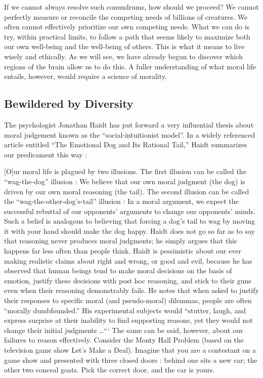 \documentclass[a4paper,14pt]{extarticle}
\begin{document}
If we cannot always resolve such conundrums, how should we proceed?
We cannot perfectly measure or reconcile the competing needs of billions of creatures.
We often cannot effectively prioritize our own competing needs.
What we can do is try, within practical limits, to follow a path that seems likely to maximize both our own well-being and the well-being of others.
This is what it means to live wisely and ethically.
As we will see, we have already begun to discover which regions of the brain allow us to do this.
A fuller understanding of what moral life entails, however, would require a science of morality.

\subsection{Bewildered by Diversity}

The psychologist Jonathan Haidt has put forward a very influential thesis about moral judgement known as the ``social-intuitionist model''.
In a widely referenced article entitled ``The Emotional Dog and Its Rational Tail,'' Haidt summarizes our predicament this way :

[O]ur moral life is plagued by two illusions.
The first illusion can be called the ``wag-the-dog'' illusion :
We believe that our own moral judgment (the dog) is driven by our own moral reasoning (the tail).
The second illusion can be called the “wag-the-other-dog's-tail” illusion :
In a moral argument, we expect the successful rebuttal of our opponents' arguments to change our opponents' minds.
Such a belief is analogous to believing that forcing a dog's tail to wag by moving it with your hand should make the dog happy.
Haidt does not go so far as to say that reasoning never produces moral judgments;
he simply argues that this happens far less often than people think.
Haidt is pessimistic about our ever making realistic claims about right and wrong, or good and evil, because he has observed that human beings tend to make moral decisions on the basis of emotion, justify these decisions with post hoc reasoning, and stick to their guns even when their reasoning demonstrably fails.
He notes that when asked to justify their responses to specific moral (and pseudo-moral) dilemmas, people are often ``morally dumbfounded.''
His experimental subjects would ``stutter, laugh, and express surprise at their inability to find supporting reasons, yet they would not change their initial judgments \dots```
The same can be said, however, about our failures to reason effectively.
Consider the Monty Hall Problem (based on the television game show Let's Make a Deal).
Imagine that you are a contestant on a game show and presented with three closed doors :
behind one sits a new car;
the other two conceal goats.
Pick the correct door, and the car is yours.
\end{document}
